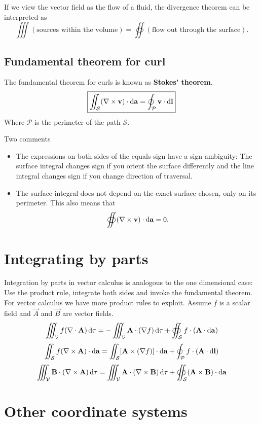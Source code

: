 If we view the vector field as the flow of a fluid, the divergence theorem can be interpreted as
\[ \iiint(\text{sources within the volume}) = \oiint (\text{flow out through the surface}). \]
\subsection{Fundamental theorem for curl}
The fundamental theorem for curls is known as \textbf{Stokes' theorem}.
\[ \boxed{ \iint_{\mathcal{S}}(\mathop{}\! \nabla\times \boldsymbol{\mathrm{v}})\cdot \operatorname{d \!}{\boldsymbol{\mathrm{a}}} = \oint_{\mathcal{P}} \boldsymbol{\mathrm{v}}\cdot \operatorname{d \!}{\boldsymbol{\mathrm{l}}} } \]
Where $\mathcal{P}$ is the perimeter of the path $\mathcal{S}$.

Two comments
\begin{itemize}
\item The expressions on both sides of the equals sign have a sign ambiguity: The surface integral changes sign if you orient the surface differently and the line integral changes sign if you change direction of traversal.
\item The surface integral does not depend on the exact surface chosen, only on its perimeter. This also means that
\[ \oiint(\mathop{}\! \nabla\times \boldsymbol{\mathrm{v}})\cdot \operatorname{d \!}{\boldsymbol{\mathrm{a}}} = 0. \]
\end{itemize}

\section{Integrating by parts}
Integration by parts in vector calculus is analogous to the one dimensional case:
Use the product rule, integrate both sides and invoke the fundamental theorem. For vector calculus we have more product rules to exploit. Assume $f$ is a scalar field and $\vec{A}$ and $\vec{B}$ are vector fields.
\[ \iiint_{\mathcal{V}}f(\nabla\cdot \boldsymbol{\mathrm{A}}) \operatorname{d \!}{\tau} = - \iiint_{\mathcal{V}}\boldsymbol{\mathrm{A}}\cdot(\mathop{}\! \nabla f) \operatorname{d \!}{\tau} + \oiint_{\mathcal{S}}f\cdot (\boldsymbol{\mathrm{A}}\cdot \operatorname{d \!}{\boldsymbol{\mathrm{a}}}) \]
\[ \iint_\mathcal{S} f(\mathop{}\! \nabla\times \boldsymbol{\mathrm{A}})\cdot \operatorname{d \!}{\boldsymbol{\mathrm{a}}} = \iint_\mathcal{S}[\boldsymbol{\mathrm{A}}\times(\mathop{}\! \nabla f)]\cdot \operatorname{d \!}{\boldsymbol{\mathrm{a}}} + \oint_\mathcal{P} f\cdot (\boldsymbol{\mathrm{A}}\cdot \operatorname{d \!}{\boldsymbol{\mathrm{l}}}) \]
\[ \iiint_\mathcal{V} \boldsymbol{\mathrm{B}}\cdot (\mathop{}\! \nabla\times \boldsymbol{\mathrm{A}})\operatorname{d \!}{\tau} = \iiint_\mathcal{V} \boldsymbol{\mathrm{A}}\cdot(\mathop{}\! \nabla\times \boldsymbol{\mathrm{B}})\operatorname{d \!}{\tau} + \oiint_{\mathcal{S}}(\boldsymbol{\mathrm{A}}\times \boldsymbol{\mathrm{B}})\cdot \operatorname{d \!}{\boldsymbol{\mathrm{a}}} \]

\section{Other coordinate systems}
